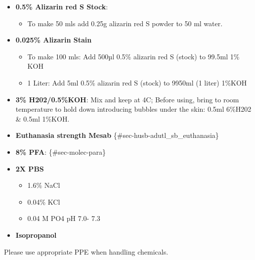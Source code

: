 \documentclass[
  letterpaper,
  DIV=11,
  numbers=noendperiod]{scrreprt}
\providecommand{\tightlist}{%
  \setlength{\itemsep}{0pt}\setlength{\parskip}{0pt}}\usepackage{longtable,booktabs,array}
\begin{document}
\begin{itemize}
\tightlist
\item
  \textbf{0.5\% Alizarin red S Stock}:

  \begin{itemize}
  \tightlist
  \item
    To make 50 mls add 0.25g alizarin red S powder to 50 ml water.
  \end{itemize}
\item
  \textbf{0.025\% Alizarin Stain}

  \begin{itemize}
  \tightlist
  \item
    To make 100 mls: Add 500µl 0.5\% alizarin red S (stock) to 99.5ml
    1\% KOH
  \item
    1 Liter: Add 5ml 0.5\% alizarin red S (stock) to 9950ml (1 liter)
    1\%KOH
  \end{itemize}
\item
  \textbf{3\% H202/0.5\%KOH}: Mix and keep at 4C; Before using, bring to
  room temperature to hold down introducing bubbles under the skin:
  0.5ml 6\%H202 \& 0.5ml 1\%KOH.
\item
  \textbf{Euthanasia strength Mesab}
  \{\#sec-husb-adutl\_sb\_euthanasia\}
\item
  \textbf{8\% PFA}: \{\#sec-molec-para\}
\item
  \textbf{2X PBS}

  \begin{itemize}
  \tightlist
  \item
    1.6\% NaCl
  \item
    0.04\% KCl
  \item
    0.04 M PO4 pH 7.0- 7.3
  \end{itemize}
\item
  \textbf{Isopropanol}
\end{itemize}

\begin{tcolorbox}[enhanced jigsaw, toprule=.15mm, breakable, coltitle=black, leftrule=.75mm, title=\textcolor{quarto-callout-warning-color}{\faExclamationTriangle}\hspace{0.5em}{Chemical Warning}, bottomrule=.15mm, toptitle=1mm, bottomtitle=1mm, colframe=quarto-callout-warning-color-frame, opacityback=0, colback=white, opacitybacktitle=0.6, colbacktitle=quarto-callout-warning-color!10!white, rightrule=.15mm, titlerule=0mm, arc=.35mm, left=2mm]

Please use appropriate PPE when handling chemicals.

\end{tcolorbox}
\end{document}
